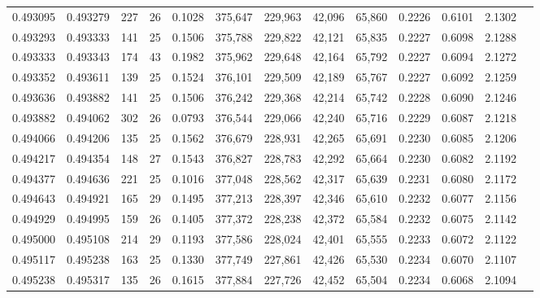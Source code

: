 \begin{tabular}{rrrrrrrrrrrrr}
0.493095 & 0.493279 &    227 &    26 &                                     0.1028 & 375,647 & 229,963 &  42,096 &  65,860 & 0.2226 & 0.6101 & 2.1302 \\
0.493293 & 0.493333 &    141 &    25 &                                     0.1506 & 375,788 & 229,822 &  42,121 &  65,835 & 0.2227 & 0.6098 & 2.1288 \\
0.493333 & 0.493343 &    174 &    43 &                                     0.1982 & 375,962 & 229,648 &  42,164 &  65,792 & 0.2227 & 0.6094 & 2.1272 \\
0.493352 & 0.493611 &    139 &    25 &                                     0.1524 & 376,101 & 229,509 &  42,189 &  65,767 & 0.2227 & 0.6092 & 2.1259 \\
0.493636 & 0.493882 &    141 &    25 &                                     0.1506 & 376,242 & 229,368 &  42,214 &  65,742 & 0.2228 & 0.6090 & 2.1246 \\
0.493882 & 0.494062 &    302 &    26 &                                     0.0793 & 376,544 & 229,066 &  42,240 &  65,716 & 0.2229 & 0.6087 & 2.1218 \\
0.494066 & 0.494206 &    135 &    25 &                                     0.1562 & 376,679 & 228,931 &  42,265 &  65,691 & 0.2230 & 0.6085 & 2.1206 \\
0.494217 & 0.494354 &    148 &    27 &                                     0.1543 & 376,827 & 228,783 &  42,292 &  65,664 & 0.2230 & 0.6082 & 2.1192 \\
0.494377 & 0.494636 &    221 &    25 &                                     0.1016 & 377,048 & 228,562 &  42,317 &  65,639 & 0.2231 & 0.6080 & 2.1172 \\
0.494643 & 0.494921 &    165 &    29 &                                     0.1495 & 377,213 & 228,397 &  42,346 &  65,610 & 0.2232 & 0.6077 & 2.1156 \\
0.494929 & 0.494995 &    159 &    26 &                                     0.1405 & 377,372 & 228,238 &  42,372 &  65,584 & 0.2232 & 0.6075 & 2.1142 \\
0.495000 & 0.495108 &    214 &    29 &                                     0.1193 & 377,586 & 228,024 &  42,401 &  65,555 & 0.2233 & 0.6072 & 2.1122 \\
0.495117 & 0.495238 &    163 &    25 &                                     0.1330 & 377,749 & 227,861 &  42,426 &  65,530 & 0.2234 & 0.6070 & 2.1107 \\
0.495238 & 0.495317 &    135 &    26 &                                     0.1615 & 377,884 & 227,726 &  42,452 &  65,504 & 0.2234 & 0.6068 & 2.1094 \\

\end{tabular}
